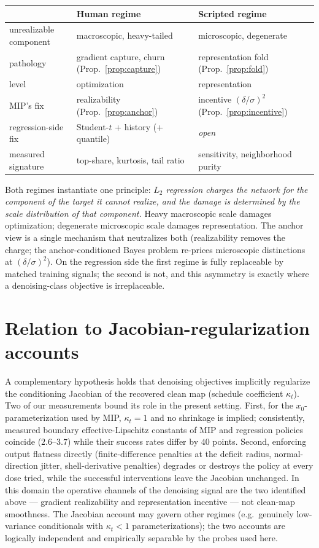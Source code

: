 \documentclass[11pt]{article}
\begin{document}
\begin{center}
\begin{tabular}{@{}lll@{}}
\toprule
 & \textbf{Human regime} & \textbf{Scripted regime} \\
\midrule
unrealizable component & macroscopic, heavy-tailed & microscopic, degenerate \\
pathology & gradient capture, churn (Prop.~\ref{prop:capture}) & representation fold (Prop.~\ref{prop:fold}) \\
level & optimization & representation \\
MIP's fix & realizability (Prop.~\ref{prop:anchor}) & incentive $(\delta/\sigma)^2$ (Prop.~\ref{prop:incentive}) \\
regression-side fix & Student-$t$ + history (+ quantile) & \emph{open} \\
measured signature & top-share, kurtosis, tail ratio & sensitivity, neighborhood purity \\
\bottomrule
\end{tabular}
\end{center}

Both regimes instantiate one principle: \emph{$L_2$ regression charges the
network for the component of the target it cannot realize, and the damage is
determined by the scale distribution of that component.} Heavy macroscopic
scale damages optimization; degenerate microscopic scale damages
representation. The anchor view is a single mechanism that neutralizes both
(realizability removes the charge; the anchor-conditioned Bayes problem
re-prices microscopic distinctions at $(\delta/\sigma)^2$). On the regression
side the first regime is fully replaceable by matched training signals; the
second is not, and this asymmetry is exactly where a denoising-class objective
is irreplaceable.

\section{Relation to Jacobian-regularization accounts}

A complementary hypothesis holds that denoising objectives implicitly regularize
the conditioning Jacobian of the recovered clean map (schedule coefficient
$\kappa_t$). Two of our measurements bound its role in the present setting.
First, for the $x_0$-parameterization used by MIP, $\kappa_t = 1$ and no
shrinkage is implied; consistently, measured boundary effective-Lipschitz
constants of MIP and regression policies coincide ($2.6$--$3.7$) while their
success rates differ by $40$ points. Second, enforcing output flatness directly
(finite-difference penalties at the deficit radius, normal-direction jitter,
shell-derivative penalties) degrades or destroys the policy at every dose tried,
while the successful interventions leave the Jacobian unchanged. In this domain
the operative channels of the denoising signal are the two identified above ---
gradient realizability and representation incentive --- not clean-map
smoothness. The Jacobian account may govern other regimes (e.g.\ genuinely
low-variance conditionals with $\kappa_t < 1$ parameterizations); the two
accounts are logically independent and empirically separable by the probes used
here.
\end{document}
